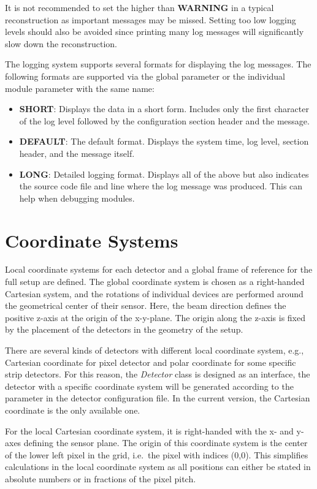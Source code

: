 \begin{warning}
    It is not recommended to set the  higher than \textbf{WARNING} in a typical reconstruction as important messages may be missed.
    Setting too low logging levels should also be avoided since printing many log messages will significantly slow down the reconstruction.
\end{warning}

The logging system supports several formats for displaying the log messages.
The following formats are supported via the global parameter  or the individual module parameter with the same name:
\begin{itemize}
\item \textbf{SHORT}: Displays the data in a short form.
Includes only the first character of the log level followed by the configuration section header and the message.
\item \textbf{DEFAULT}: The default format.
Displays the system time, log level, section header, and the message itself.
\item \textbf{LONG}: Detailed logging format.
Displays all of the above but also indicates the source code file and line where the log message was produced.
This can help when debugging modules.
\end{itemize}

\section{Coordinate Systems}
\label{sec:coordinate_systems}

Local coordinate systems for each detector and a global frame of reference for the full setup are defined.
The global coordinate system is chosen as a right-handed Cartesian system, and the rotations of individual devices are performed around the geometrical center of their sensor.
Here, the beam direction defines the positive z-axis at the origin of the x-y-plane.
The origin along the z-axis is fixed by the placement of the detectors in the geometry of the setup.

There are several kinds of detectors with different local coordinate system, e.g., Cartesian coordinate for pixel detector and polar coordinate for some specific strip detectors. For this reason, the \textsl{Detector} class is designed as an interface, the detector with a specific coordinate system will be generated according to the parameter in the detector configuration file. In the current version, the Cartesian coordinate is the only available one.

For the local Cartesian coordinate system, it is right-handed with the x- and y-axes defining the sensor plane.  The origin of this coordinate system is the center of the lower left pixel in the grid, i.e.\ the pixel with indices (0,0).  This simplifies calculations in the local coordinate system as all positions can either be stated in absolute numbers or in fractions of the pixel pitch.

